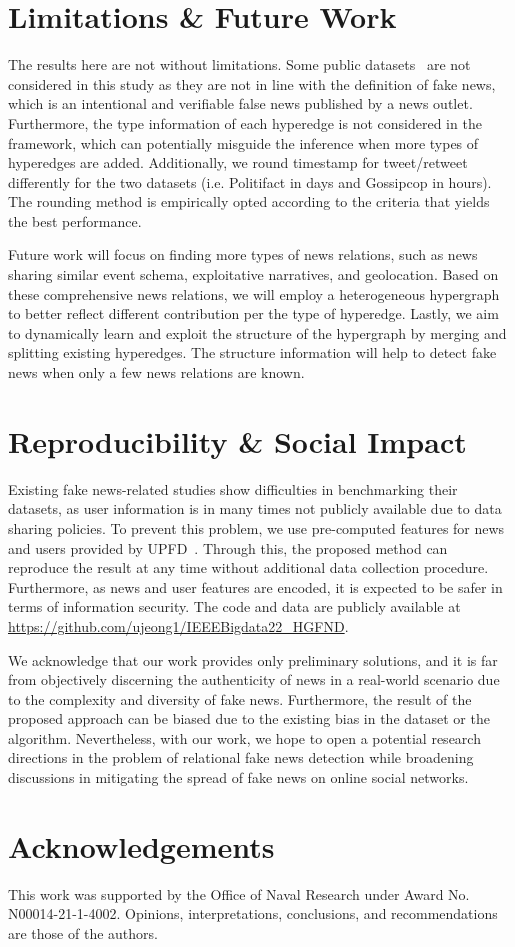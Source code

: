 \documentclass[conference]{IEEEtran}
\begin{document}
\section{Limitations \& Future Work }
The results here are not without limitations. Some public datasets~\cite{ma2016detecting, ma2017detect, kochkina2017turing} are not considered in this study as they are not in line with the definition of fake news, which is an intentional and verifiable false news published by a news outlet. Furthermore, the type information of each hyperedge is not considered in the framework, which can potentially misguide the inference when more types of hyperedges are added. Additionally, we round timestamp for tweet/retweet differently for the two datasets (i.e. Politifact in days and Gossipcop in hours). The rounding method is empirically opted according to the criteria that yields the best performance.



Future work will focus on finding more types of news relations, such as news sharing similar event schema, exploitative narratives, and geolocation. Based on these comprehensive news relations, we will employ a heterogeneous hypergraph to better reflect different contribution per the type of hyperedge. Lastly, we aim to dynamically learn and exploit the structure of the hypergraph by merging and splitting existing hyperedges. The structure information will help to detect fake news when only a few news relations are 
known.

\section{Reproducibility \& Social Impact}
Existing fake news-related studies show difficulties in benchmarking their datasets, as user information is in many times not publicly available due to data sharing policies. To prevent this problem, we use pre-computed features for news and users provided by UPFD~\cite{dou2021user}. Through this, the proposed method can reproduce the result at any time without additional data collection procedure. Furthermore, as news and user features are encoded, it is expected to be safer in terms of information security. The code and data are publicly available at \url{https://github.com/ujeong1/IEEEBigdata22_HGFND}.

We acknowledge that our work provides only preliminary solutions, and it is far from objectively discerning the authenticity of news in a real-world scenario due to the complexity and diversity of fake news. Furthermore, the result of the proposed approach can be biased due to the existing bias in the dataset or the algorithm. Nevertheless, with our work, we hope to open a potential research directions in the problem of relational fake news detection while broadening discussions in mitigating the spread of fake news on online social networks.

\section{Acknowledgements}
This work was supported by the Office of Naval Research under Award No. N00014-21-1-4002. Opinions, interpretations, conclusions, and recommendations
are those of the authors.




\end{document}
